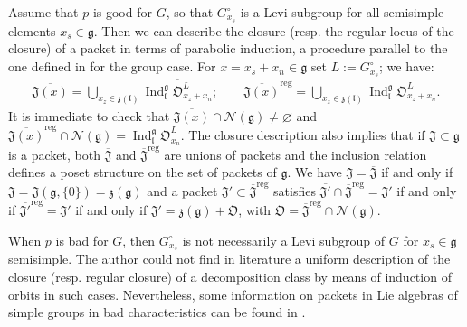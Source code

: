 \documentclass[12pt]{amsart}
\theoremstyle{definition}
\theoremstyle{remark}
\newcommand{\g}{\mathfrak{g}}
\renewcommand{\l}{\mathfrak{l}}
\newcommand{\z}{\mathfrak{z}}
\newcommand{\J}{\mathfrak{J}}
\newcommand{\orb}{\mathfrak{O}}
\newcommand{\N}{\mathcal{N}}
\newcommand{\reg}{{\operatorname{reg}}}
\newcommand{\Ind}{\operatorname{Ind}}
\begin{document}
Assume that $p$ is good for $G$, so that $G_{x_s}^\circ$ is a Levi subgroup for all semisimple elements $x_s \in \g$.
Then we can describe the closure (resp. the regular locus of the closure) of a packet in terms of parabolic induction, a procedure parallel to the one defined in \cite{LS79} for the group case.
For $x = x_s + x_n \in \g$ set $L := G_{x_s}^\circ$; we have:
\begin{align*}
\overline{\J(x)} = \bigcup_{x_z \in \z(\l)} \overline{\Ind_{\l}^{\g} \orb^L_{ x_z + x_n} }; \qquad
\overline{\J(x)}^\reg = \bigcup_{x_z \in \z(\l)} \Ind_{\l}^{\g} \orb^L_{ x_z + x_n}.
\end{align*}
It is immediate to check that $\overline{\J(x)} \cap \N(\g) \neq \varnothing$ and $\overline{\J(x)}^\reg \cap \N(\g) = \Ind_{\l}^\g \orb^L_{x_n}$.
The closure description also implies that if $\J \subset \g$ is a packet, both $\overline{\J}$ and $\overline{\J}^\reg$ are unions of packets and the inclusion relation defines a poset structure on the set of packets of $\g$.
We have $\J = \overline{\J}$ if and only if $\J = \J(\g, \{0\}) = \z(\g)$ and
a packet $\J' \subset \overline{\J}^\reg$ satisfies $\overline{\J'} \cap \overline{\J}^\reg = \J'$ if and only if $\overline{\J'}^\reg = \J'$ if and only if $\J' = \z(\g) + \orb$, with $\orb = \overline{\J}^\reg \cap \N(\g)$.

When $p$ is bad for $G$, then $G_{x_s}^\circ$ is not necessarily a Levi subgroup of $G$ for $x_s \in \g$ semisimple.
The author could not find in literature a uniform description of the closure (resp. regular closure) of a decomposition class by means of induction of orbits in such cases.
Nevertheless, some information on packets in Lie algebras of simple groups in bad characteristics can be found in \cite{Sp_bad, Sp_f4}.
\end{document}
